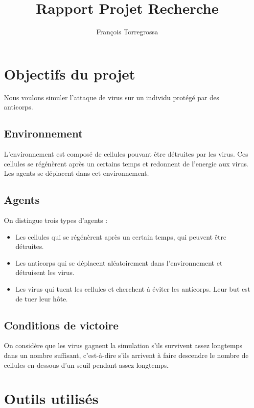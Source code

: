 \documentclass[11pt]{article} %
\title{Rapport Projet Recherche}
\author{François Torregrossa}
\begin{document}
\maketitle

\section{Objectifs du projet}

Nous voulons simuler l'attaque de virus sur un individu protégé par des anticorps. 

\subsection{Environnement}

L'environnement est composé de cellules pouvant être détruites par les virus. Ces cellules se régénèrent après un certains temps et redonnent de l'energie aux virus. Les agents se déplacent dans cet environnement.

\subsection{Agents}

On distingue trois types d'agents :
\begin{itemize}
	\item Les cellules qui se régénèrent après un certain temps, qui peuvent être détruites.
	\item Les anticorps qui se déplacent aléatoirement dans l'environnement et détruisent les virus.
	\item Les virus qui tuent les cellules et cherchent à éviter les anticorps. Leur but est de tuer leur hôte.
\end{itemize}

\subsection{Conditions de victoire}

On considère que les virus gagnent la simulation s'ils survivent assez longtemps dans un nombre suffisant, c'est-à-dire s'ils arrivent à faire descendre le nombre de cellules en-dessous d'un seuil pendant assez longtemps.

\section{Outils utilisés}
\end{document}
